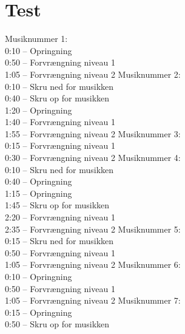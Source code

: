 \section{Test}
Musiknummer 1:\\
0:10 – Opringning\\
0:50 – Forvrængning niveau 1\\
1:05 – Forvrængning niveau 2\blankline
%
Musiknummer 2:\\
0:10 – Skru ned for musikken\\
0:40 – Skru op for musikken\\
1:20 – Opringning\\
1:40 – Forvrængning niveau 1\\
1:55 – Forvrængning niveau 2\blankline 
%
Musiknummer 3:\\
0:15 – Forvrængning niveau 1\\
0:30 – Forvrængning niveau 2\blankline 
%
Musiknummer 4:\\
0:10 – Skru ned for musikken\\
0:40 – Opringning\\
1:15 – Opringning\\
1:45 – Skru op for musikken\\
2:20 – Forvrængning niveau 1\\
2:35 – Forvrængning niveau 2\blankline
%
Musiknummer 5:\\
0:15 – Skru ned for musikken\\
0:50 – Forvrængning niveau 1\\
1:05 – Forvrængning niveau 2\blankline 
%
Musiknummer 6:\\
0:10 – Opringning\\
0:50 – Forvrængning niveau 1\\
1:05 – Forvrængning niveau 2\blankline 
%
Musiknummer 7:\\
0:15 – Opringning\\
0:50 – Skru op for musikken